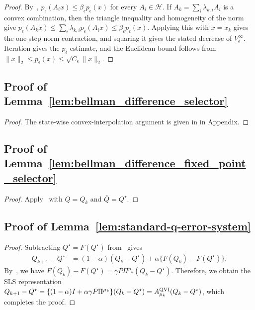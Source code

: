 \documentclass[letterpaper]{article}
\numberwithin{equation}{section}
\begin{document}
\begin{proof}
By~, $p_\epsilon(A_i x)\leq\beta_\epsilon p_\epsilon(x)$ for every $A_i\in\mathcal H$. If
$A_k=\sum_i\lambda_{k,i}A_i$ is a convex combination, then the triangle inequality
and homogeneity of the norm give $p_\epsilon(A_kx)
\leq
\sum_i\lambda_{k,i}p_\epsilon(A_i x)
\leq
\beta_\epsilon p_\epsilon(x)$. Applying this with $x=x_k$ gives the one-step norm contraction, and squaring it
gives the stated decrease of $V_\epsilon^\infty$. Iteration gives the
$p_\epsilon$ estimate, and the Euclidean bound follows from
$\|x\|_2\leq p_\epsilon(x)\leq\sqrt{C_\epsilon}\|x\|_2$.
\end{proof}

\subsection{Proof of Lemma~\ref{lem:bellman_difference_selector}}
\label{app:proof-lem-bellman-difference-selector}

\begin{proof}
The state-wise convex-interpolation argument is given in  in Appendix.
\end{proof}

\subsection{Proof of Lemma~\ref{lem:bellman_difference_fixed_point_selector}}
\label{app:proof-lem-bellman-difference-fixed-point-selector}

\begin{proof}
Apply~ with $Q=Q_k$ and
$\bar Q=Q^\star$.
\end{proof}

\subsection{Proof of Lemma~\ref{lem:standard-q-error-system}}
\label{app:proof-lem-standard-q-error-system}

\begin{proof}
Subtracting $Q^\star=F(Q^\star)$ from~ gives
\begin{align*}
  Q_{k+1}-Q^\star
  &=(1-\alpha)(Q_k-Q^\star)
    +\alpha\{F(Q_k)-F(Q^\star)\}.
\end{align*}
By~, we have $F(Q_k)-F(Q^\star) =\gamma P\Pi^{\mu_k}(Q_k-Q^\star)$. Therefore, we obtain the SLS representation
$Q_{k+1}-Q^\star =\{(1-\alpha)I+\alpha\gamma P\Pi^{\mu_k}\}(Q_k-Q^\star)=A_{\mu_k}^{\rm QVI}(Q_k-Q^\star)$, which completes the proof.
\end{proof}
\end{document}
